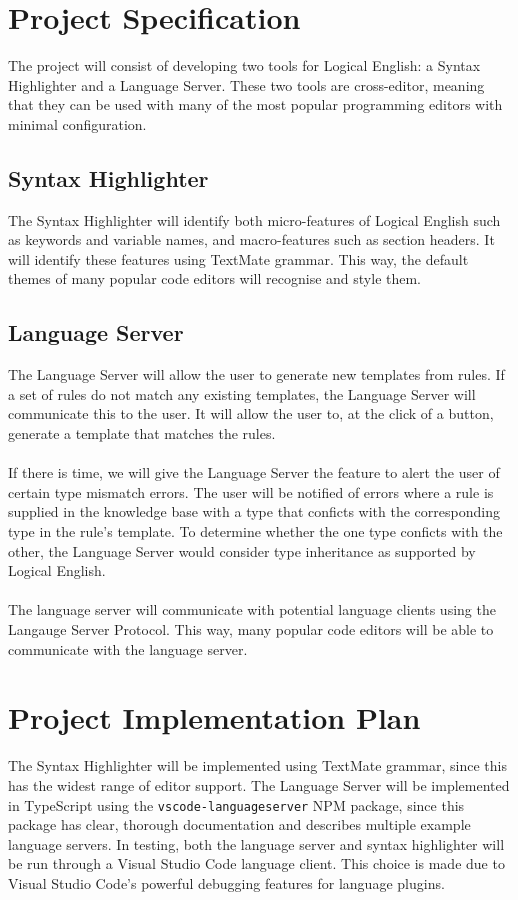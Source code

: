 \documentclass[../main.tex]{subfiles}
\begin{document}
\section*{Project Specification}
The project will consist of developing two tools for Logical English: a Syntax Highlighter and a Language Server. These two tools are cross-editor, meaning that they can be used with many of the most popular programming editors with minimal configuration.

\subsection*{Syntax Highlighter}
The Syntax Highlighter will identify both micro-features of Logical English such as keywords and variable names, and macro-features such as section headers. It will identify these features using TextMate grammar. This way, the default themes of many popular code editors will recognise and style them. 

\subsection*{Language Server}
The Language Server will allow the user to generate new templates from rules. If a set of rules do not match any existing templates, the Language Server will communicate this to the user. It will allow the user to, at the click of a button, generate a template that matches the rules. 
\\ \\ 
If there is time, we will give the Language Server the feature to alert the user of certain type mismatch errors. The user will be notified of errors where a rule is supplied in the knowledge base with a type that conficts with the corresponding type in the rule's template. To determine whether the one type conficts with the other, the Language Server would consider type inheritance as supported by Logical English.
\\ \\
The language server will communicate with potential language clients using the Langauge Server Protocol. This way, many popular code editors will be able to communicate with the language server.

\section*{Project Implementation Plan}
The Syntax Highlighter will be implemented using TextMate grammar, since this has the widest range of editor support.  The Language Server will be implemented in TypeScript using the \texttt{vscode-languageserver} NPM package, since this package has clear, thorough documentation and describes multiple example language servers. In testing, both the language server and syntax highlighter will be run through a Visual Studio Code language client. This choice is made due to Visual Studio Code's powerful debugging features for language plugins.
\end{document}
